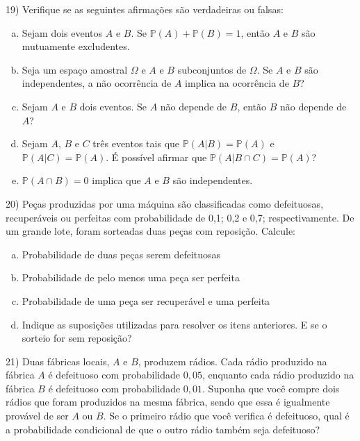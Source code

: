 \documentclass{article}
\begin{document}
\vspace{5px}

19) Verifique se as seguintes afirmações são verdadeiras ou falsas:

\begin{enumerate}[a)]
    \item Sejam dois eventos $A$ e $B$. Se $\mathds{P}(A) + \mathds{P}(B) = 1$, então $A$ e $B$ são mutuamente excludentes.
    \item Seja um espaço amostral $\Omega$ e $A$ e $B$ subconjuntos de $\Omega$. Se $A$ e $B$ são independentes, a não ocorrência de $A$ implica na ocorrência de $B$?
    \item Sejam $A$ e $B$ dois eventos. Se $A$ não depende de $B$, então $B$ não depende de $A$?
    \item Sejam $A$, $B$ e $C$ três eventos tais que $\mathds{P}(A|B) = \mathds{P}(A)$ e $\mathds{P}(A|C) = \mathds{P}(A)$. É possível afirmar que $\mathds{P}(A|B \cap C) =  \mathds{P}(A)$?
    \item $\mathds{P}(A \cap B) = 0$ implica que $A$ e $B$ são independentes.
\end{enumerate}

\vspace{5px}

20) Peças produzidas por uma máquina são classificadas como defeituosas,
recuperáveis ou perfeitas com probabilidade de 0,1; 0,2 e 0,7; respectivamente.
De um grande lote, foram sorteadas duas peças com reposição. Calcule:

\begin{enumerate}[a)] %
    \item Probabilidade de duas peças serem defeituosas
    \item Probabilidade de pelo menos uma peça ser perfeita
    \item Probabilidade de uma peça ser recuperável e uma perfeita
    \item Indique as suposições utilizadas para resolver os itens anteriores. E se o sorteio for sem reposição?
\end{enumerate}



\vspace{5px}

21) Duas fábricas locais, \(A\) e \(B\), produzem rádios. Cada rádio produzido na fábrica \(A\) é defeituoso com probabilidade \(0{,}05\),
enquanto cada rádio produzido na fábrica \(B\) é defeituoso com probabilidade \(0{,}01\).
Suponha que você compre dois rádios que foram produzidos na mesma fábrica, sendo que essa 
é igualmente provável de ser \(A\) ou \(B\). Se o primeiro rádio que você verifica é defeituoso,
qual é a probabilidade condicional de que o outro rádio também seja defeituoso?
\end{document}

